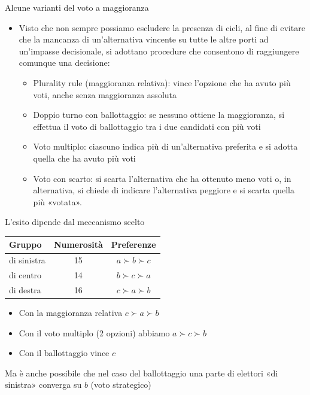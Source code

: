 \documentclass[aspectratio=64,11pt]{beamer}
\begin{document}
\begin{frame}{Alcune varianti del voto a maggioranza}
\begin{itemize}
\item Visto che non sempre possiamo escludere la presenza di cicli, al fine di
evitare che la mancanza di un'alternativa vincente su tutte le altre porti ad
un'impasse decisionale, si adottano procedure che consentono di raggiungere
comunque una decisione:
\begin{itemize}
\item \alert{Plurality rule (maggioranza relativa)}: vince l'opzione che ha avuto più
voti, anche senza maggioranza assoluta
\item \alert{Doppio turno con ballottaggio:} se nessuno ottiene la maggioranza, si
effettua il voto di ballottaggio tra i due candidati con più voti
\item \alert{Voto multiplo:} ciascuno indica più di un'alternativa preferita e si
adotta quella che ha avuto più voti
\item \alert{Voto con scarto:} si scarta l'alternativa che ha ottenuto meno voti o, in
alternativa, si chiede di indicare l'alternativa peggiore e si scarta
quella più «votata».
\end{itemize}
\end{itemize}
\end{frame}

\begin{frame}{L'esito dipende dal meccanismo scelto}
\begin{center}
  \begin{tabular}{lcc}\toprule
  Gruppo & Numerosità &Preferenze\\
  \midrule
  di sinistra & 15 & $a \succ b \succ c$ \\
  di centro & 14 & $b \succ c \succ a$\\
  di destra & 16 & $c \succ a \succ b$\\\bottomrule
  \end{tabular}
\end{center}

\begin{itemize}
\item Con la maggioranza relativa $c\succ a\succ b$
\item Con il voto multiplo (2 opzioni) abbiamo $a\succ c\succ b$
\item Con il ballottaggio vince $c$
\end{itemize}
Ma è anche possibile che nel caso del ballottaggio una parte di elettori «di
sinistra» converga su $b$ (voto strategico)
\end{frame}
\end{document}
